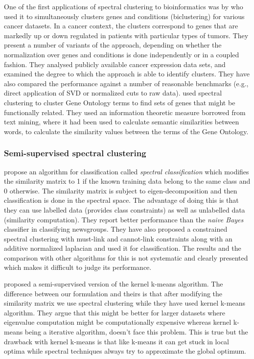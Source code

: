 One of the first applications of spectral clustering to bioinformatics was by \citet{kluger2003spectral} who used it to simultaneously clusters genes and conditions (biclustering) for various cancer datasets. In a cancer context, the clusters correspond to genes that are markedly up or down regulated in patients with particular types of tumors. They present a number of variants of the approach, depending on whether the normalization over genes and conditions is done independently or in a coupled fashion. They analysed publicly available cancer expression data sets, and examined the degree to which the approach is able to identify clusters. They have also compared the performance against a number of reasonable benchmarks (e.g., direct application of SVD or normalized cuts to raw data). \citet{speer05spectral} used spectral clustering to cluster Gene Ontology terms to find sets of genes that might be functionally related. They used an information theoretic measure borrowed from text mining, where it had been used to calculate semantic similarities between words, to calculate the similarity values between the terms of the Gene Ontology.

\subsubsection{Semi-supervised spectral clustering}
\citet{kamvar03spectral} propose an algorithm for classification called \textit{spectral classification} which modifies the similarity matrix to 1 if the known training data 
belong to the same class and 0 otherwise. The similarity matrix is subject to eigen-decomposition and then classification is done in the spectral space. The advantage of doing this is that they can use labelled data (provides class constraints) as well as unlabelled data (similarity computation). They report better performance than the \textit{naive Bayes} classifier in classifying newsgroups. They have also proposed a constrained spectral clustering with must-link and cannot-link constraints along with an additive normalized laplacian \citep{fiedler1975property} and used it for classification. The results and the comparison with other algorithms for this is not systematic and clearly presented which makes it difficult to judge its performance. 

\citet{brian_semisupgraph2005} proposed a semi-supervised version of the kernel k-means algorithm. The difference between our formulation and theirs is that after modifying the similarity matrix we use spectral clustering while they have used kernel k-means algorithm. They argue that this might be better for larger datasets where eigenvalue computation might be computationally expensive whereas kernel k-means being a iterative algorithm, doesn't face this problem. This is true but the drawback with kernel k-means is that like k-means it can get stuck in local optima while spectral techniques always try to approximate the global optimum.

